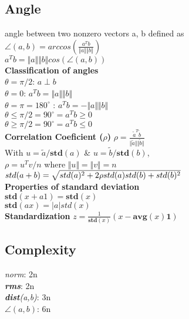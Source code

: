\subsection{Angle}
angle between two nonzero vectors a, b defined as\\
$\angle(a,b) = arccos(\frac{a^Tb}{\Vert a \Vert \Vert b \Vert})$\\
$a^Tb = \Vert a \Vert \Vert b \Vert cos (\angle(a,b))$\\
\textbf{Classification of angles}\\

$\theta = \pi/2$: $a \perp b$\\
$\theta = 0$: $a^Tb = \Vert a \Vert \Vert b \Vert$\\
$\theta = \pi = 180^{\circ}$ : $a^Tb = -\Vert a \Vert \Vert b\Vert$\\
$\theta \leq \pi/2 = 90^{\circ} = a^Tb \geq 0$\\
$\theta \geq \pi/2 = 90^{\circ} = a^Tb \leq 0$\\
\textbf{Correlation Coeficient ($\rho$)}
$\rho = \frac{\tilde{a}^T\tilde{b}}{\Vert\tilde{a}\Vert\Vert\tilde{b}\Vert}$\\
With $u = \tilde{a}/\textbf{std}(a)$ \& $u = \tilde{b}/\textbf{std}(b)$, \\
$\rho = u^Tv/n$ where $\Vert u \Vert = \Vert v \Vert = n$\\

$std(a+b) = \\
\sqrt{std(a)^2+ 2\rho std(a)std(b) +std(b)^2}$\\
\textbf{Properties of standard deviation}\\
\textbullet  $\textbf{std}(x+a1) = \textbf{std}(x)$\\
\textbullet $\textbf{std}(ax) = |a| std(x)$\\
\textbf{Standardization}
$z = \frac{1}{\textbf{std}(x)}(x - \textbf{avg}(x)\textbf{1})$

\subsection{Complexity}
\textbullet \textit{norm}: 2n\\
\textbullet \textit{\textbf{rms}}: 2n\\
\textbullet \textit{\textbf{dist}(a,b)}: 3n\\
\textbullet \textit{$\angle(a,b)$}: 6n\\
